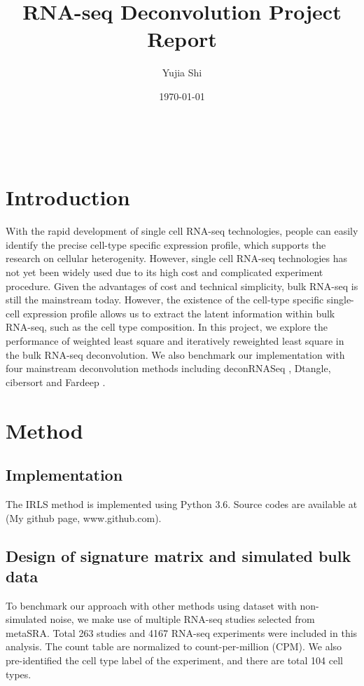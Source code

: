 \documentclass[10pt, a4paper, oneside]{article}
\title{RNA-seq Deconvolution Project Report}
\author{Yujia Shi}
\date{\today}
\begin{document}
\maketitle

\tableofcontents %
\section{Introduction}
With the rapid development of single cell RNA-seq technologies, people can easily identify the precise cell-type specific expression
profile, which supports the research on cellular heterogenity. However, single cell RNA-seq technologies has not yet been widely
used due to its high cost and complicated experiment procedure. Given the advantages of cost and technical simplicity, bulk RNA-seq
is still the mainstream today. However, the existence of the cell-type specific single-cell expression profile allows us to extract the latent
information within bulk RNA-seq, such as the cell type composition. In this project, we explore the performance of weighted least square and iteratively reweighted
least square in the bulk RNA-seq deconvolution. We also benchmark our implementation with four mainstream deconvolution methods including deconRNASeq \cite{gong2013deconrnaseq}, Dtangle\cite{hunt2019dtangle},
cibersort \cite{newman2015robust} and Fardeep \cite{hao2019fast}.
\section{Method} %

\subsection{Implementation} %
\justify 
The IRLS method is implemented using Python 3.6. Source codes are available at (My github page, www.github.com).

\subsection{Design of signature matrix and simulated bulk data}
\justify
To benchmark our approach with other methods using dataset with non-simulated noise, 
we make use of multiple RNA-seq studies selected from metaSRA. \cite{bernstein2017metasra}
Total 263 studies and 4167 RNA-seq experiments were included in this analysis. 
The count table are normalized to count-per-million (CPM). 
We also pre-identified the cell type label of the experiment, and there are total 104 cell types. 
\end{document}
